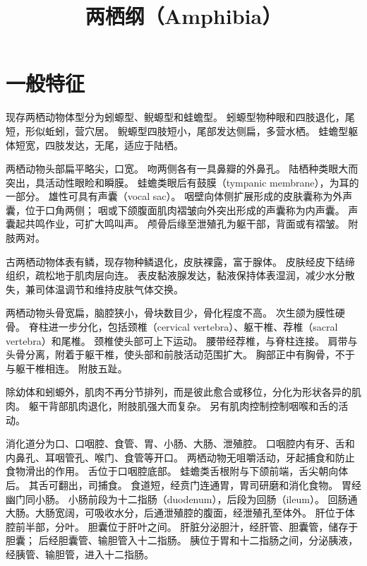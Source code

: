 \documentclass[11pt]{article}
\title{两栖纲（Amphibia）}
\date{}
\begin{document}
  \maketitle

  \linenumbers
\section{一般特征}
现存两栖动物体型分为蚓螈型、鲵螈型和蛙蟾型。
蚓螈型物种眼和四肢退化，尾短，形似蚯蚓，营穴居。
鲵螈型四肢短小，尾部发达侧扁，多营水栖。
蛙蟾型躯体短宽，四肢发达，无尾，适应于陆栖。

\newline

两栖动物头部扁平略尖，口宽。
吻两侧各有一具鼻瓣的外鼻孔。
陆栖种类眼大而突出，具活动性眼睑和瞬膜。
蛙蟾类眼后有鼓膜（tympanic membrane），为耳的一部分。
雄性可具有声囊（vocal sac）。
咽壁向体侧扩展形成的皮肤囊称为外声囊，位于口角两侧；
咽或下颌腹面肌肉褶皱向外突出形成的声囊称为内声囊。
声囊起共鸣作业，可扩大鸣叫声。
颅骨后缘至泄殖孔为躯干部，背面或有褶皱。
附肢两对。

\newline

古两栖动物体表有鳞，现存物种鳞退化，皮肤裸露，富于腺体。
皮肤经皮下结缔组织，疏松地于肌肉层向连。
表皮黏液腺发达，黏液保持体表湿润，减少水分散失，兼司体温调节和维持皮肤气体交换。

\newline

两栖动物头骨宽扁，脑腔狭小，骨块数目少，骨化程度不高。
次生颌为膜性硬骨。
脊柱进一步分化，包括颈椎（cervical vertebra）、躯干椎、荐椎（sacral vertebra）和尾椎。
颈椎使头部可上下运动。
腰带经荐椎，与脊柱连接。
肩带与头骨分离，附着于躯干椎，使头部和前肢活动范围扩大。
胸部正中有胸骨，不于与躯干椎相连。
附肢五趾。

\newline

除幼体和蚓螈外，肌肉不再分节排列，而是彼此愈合或移位，分化为形状各异的肌肉。
躯干背部肌肉退化，附肢肌强大而复杂。
另有肌肉控制控制咽喉和舌的活动。

\newline

消化道分为口、口咽腔、食管、胃、小肠、大肠、泄殖腔。
口咽腔内有牙、舌和内鼻孔、耳咽管孔、喉门、食管等开口。
两栖动物无咀嚼活动，牙起捕食和防止食物滑出的作用。
舌位于口咽腔底部。
蛙蟾类舌根附与下颌前端，舌尖朝向体后。
其舌可翻出，司捕食。
食道短，经贲门连通胃，胃司研磨和消化食物。
胃经幽门同小肠。
小肠前段为十二指肠（duodenum），后段为回肠（ileum）。
回肠通大肠。大肠宽阔，可吸收水分，后通泄殖腔的腹面，经泄殖孔至体外。
肝位于体腔前半部，分叶。
胆囊位于肝叶之间。
肝脏分泌胆汁，经肝管、胆囊管，储存于胆囊；
后经胆囊管、输胆管入十二指肠。
胰位于胃和十二指肠之间，分泌胰液，经胰管、输胆管，进入十二指肠。
\end{document}
